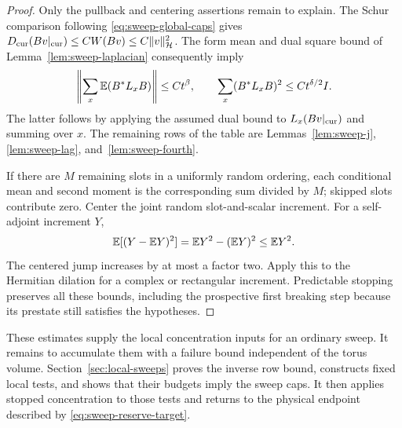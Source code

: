 \begin{proof}
Only the pullback and centering assertions remain to explain.
The Schur comparison following \eqref{eq:sweep-global-caps} gives
$D_{\rm cur}(Bv|_{\rm cur})\le CW(Bv)\le C\|v\|_{\mathcal H}^2$.
The form mean and dual square bound of
Lemma~\ref{lem:sweep-laplacian} consequently imply
\[
 \left\|\sum_x\mathbb E(B^*L_xB)\right\|\le Ct^\beta,\qquad
 \sum_x(B^*L_xB)^2\le Ct^{\delta/2}I.
\]
The latter follows by applying the assumed dual bound to
$L_x(Bv|_{\rm cur})$ and summing over $x$.
The remaining rows of the table are Lemmas~\ref{lem:sweep-j},
\ref{lem:sweep-lag}, and~\ref{lem:sweep-fourth}.

If there are $M$ remaining slots in a uniformly random ordering, each
conditional mean and second moment is the corresponding sum divided by
$M$; skipped slots contribute zero. Center the joint random
slot-and-scalar increment. For a self-adjoint increment $Y$,
\[
 \mathbb E[(Y-\mathbb E Y)^2]=\mathbb E Y^2-(\mathbb E Y)^2\le\mathbb E Y^2.
\]
The centered jump increases by at most a factor two. Apply this to
the Hermitian dilation for a complex or rectangular increment.
Predictable stopping preserves all these bounds, including the
prospective first breaking step because its prestate still satisfies
the hypotheses.
\end{proof}

These estimates supply the local concentration inputs for an ordinary
sweep. It remains to accumulate them with a failure bound independent of
the torus volume. Section~\ref{sec:local-sweeps} proves the inverse row bound,
constructs fixed local tests, and shows that their budgets imply the
sweep caps. It then applies stopped concentration to those tests and
returns to the physical endpoint described by
\eqref{eq:sweep-reserve-target}.
